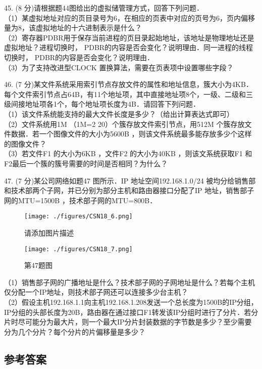 45. (8 分)请根据题44图给出的虚拟储管理方式，回答下列问题． \\
（1）某虚拟地址对应的页目录号为6，在相应的页表中对应的页号为6，页内偏移量为8，该虚拟地址的十六进制表示是什么？ \\
（2）寄存器PDBR用于保存当前进程的页目录起始地址，该地址是物理地址还是虚拟地址？进程切换时， PDBR的内容是否会变化？说明理由．同一进程的线程切换时， PDBR的内容是否会变化？说明理由． \\
（3）为了支持改进型CLOCK 置换算法，需要在页表项中设置哪些字段？

46. (7 分)某文件系统采用索引节点存放文件的属性和地址信息，簇大小为4KB．每个文件索引节点占64B，有11个地址项，其中直接地址项8个，一级、二级和三级间接地址项各1个，每个地址项长度为4B．请回答下列问题． \\
（1）该文件系统能支持的最大文件长度是多少？（给出计算表达式即可） \\
（2）文件系统用1M （1M=2 20）个簇存放文件索引节点，用512M 个簇存放文件数据．若一个图像文件的大小为5600B ，则该文件系统最多能存放多少个这样的图像文件？ \\
（3）若文件F1 的大小为6KB ，文件F2 的大小为40KB ，则该文系统获取F1 和F2最后一个簇的簇号需要的时间是否相同？为什么？

47. (7 分)某公司网络如题47 图所示．IP 地址空间192.168.1.0/24 被均分给销售部和技术部两个子网，并已分别为部分主机和路由器接口分配了IP 地址，销售部子网的MTU=1500B ，技术部子网的MTU=800B．
\begin{figure}[ht]
\centering
\texttt{[image: ./figures/CSN18\_6.png]}
\caption{请添加图片描述} \label{CSN18_fig6}
\end{figure}
\begin{figure}[ht]
\centering
\texttt{[image: ./figures/CSN18\_7.png]}
\caption{第47题图} \label{CSN18_fig7}
\end{figure}
（1）销售部子网的广播地址是什么？技术部子网的子网地址是什么？若每个主机仅分配一个IP地址，则技术部子网还可以连接多少台主机？ \\
（2）假设主机192.168.1.1向主机192.168.1.208发送一个总长度为1500B的IP分组，IP分组的头部长度为20B，路由器在通过接口F1转发该IP分组时进行了分片．若分片时尽可能分为最大片，则一个最大IP分片封装数据的字节数是多少？至少需要分为几个分片？每个分片的片偏移量是多少？

\subsection{参考答案}
